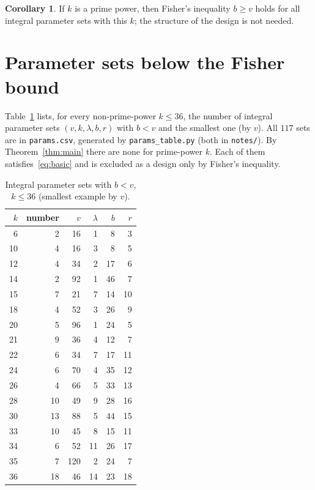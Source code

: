\documentclass[11pt,a4paper]{article}
\theoremstyle{definition}
\newtheorem{corollary}[theorem]{Corollary}
\begin{document}
\begin{corollary}
  If $k$ is a prime power, then Fisher's inequality $b\ge v$ holds for all integral parameter sets with this $k$; the structure of the design is not needed.
\end{corollary}

\section{Parameter sets below the Fisher bound}\label{sec:data}
Table~\ref{tab:data} lists, for every non-prime-power $k\le36$, the number of integral parameter sets $(v,k,\lambda,b,r)$ with $b<v$ and the smallest one (by $v$).
All $117$ sets are in \texttt{params.csv}, generated by \texttt{params\_table.py} (both in \texttt{notes/}).
By Theorem~\ref{thm:main} there are none for prime-power $k$.
Each of them satisfies~\eqref{eq:basic} and is excluded as a design only by Fisher's inequality.

\begin{table}[!ht]
  \centering
  \caption{Integral parameter sets with $b<v$, $k\le36$ (smallest example by $v$).}\label{tab:data}
  \begin{tabular}{rrrrrr}
  \toprule
  $k$ & number & $v$ & $\lambda$ & $b$ & $r$ \\\midrule
  6 & 2 & 16 & 1 & 8 & 3 \\
  10 & 4 & 16 & 3 & 8 & 5 \\
  12 & 4 & 34 & 2 & 17 & 6 \\
  14 & 2 & 92 & 1 & 46 & 7 \\
  15 & 7 & 21 & 7 & 14 & 10 \\
  18 & 4 & 52 & 3 & 26 & 9 \\
  20 & 5 & 96 & 1 & 24 & 5 \\
  21 & 9 & 36 & 4 & 12 & 7 \\
  22 & 6 & 34 & 7 & 17 & 11 \\
  24 & 6 & 70 & 4 & 35 & 12 \\
  26 & 4 & 66 & 5 & 33 & 13 \\
  28 & 10 & 49 & 9 & 28 & 16 \\
  30 & 13 & 88 & 5 & 44 & 15 \\
  33 & 10 & 45 & 8 & 15 & 11 \\
  34 & 6 & 52 & 11 & 26 & 17 \\
  35 & 7 & 120 & 2 & 24 & 7 \\
  36 & 18 & 46 & 14 & 23 & 18 \\
  \bottomrule
  \end{tabular}
\end{table}
\end{document}
